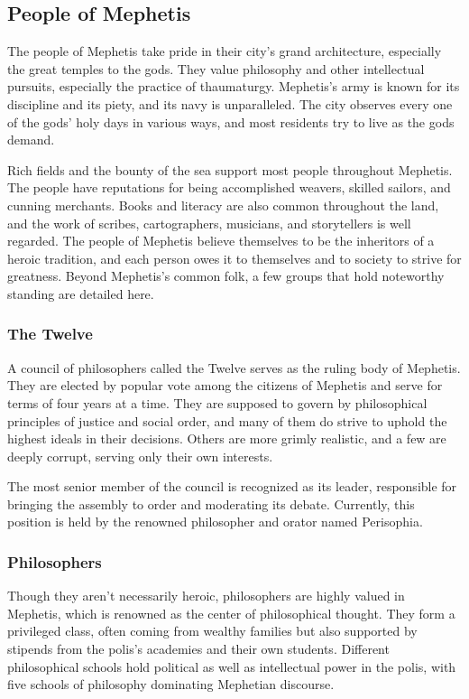 \newpage

\subsection*{People of Mephetis}
    The people of Mephetis take pride in their city's grand architecture, especially the great temples to the gods.
    They value philosophy and other intellectual pursuits, especially the practice of thaumaturgy.
    Mephetis's army is known for its discipline and its piety, and its navy is unparalleled.
    The city observes every one of the gods' holy days in various ways, and most residents try to live as the gods demand.

    Rich fields and the bounty of the sea support most people throughout Mephetis.
    The people have reputations for being accomplished weavers, skilled sailors, and cunning merchants.
    Books and literacy are also common throughout the land, and the work of scribes, cartographers, musicians, and storytellers is well regarded.
    The people of Mephetis believe themselves to be the inheritors of a heroic tradition, and each person owes it to themselves and to society to strive for greatness.
    Beyond Mephetis's common folk, a few groups that hold noteworthy standing are detailed here.

    \subsubsection{The Twelve}
        A council of philosophers called the Twelve serves as the ruling body of Mephetis.
        They are elected by popular vote among the citizens of Mephetis and serve for terms of four years at a time.
        They are supposed to govern by philosophical principles of justice and social order, and many of them do strive to uphold the highest ideals in their decisions.
        Others are more grimly realistic, and a few are deeply corrupt, serving only their own interests.

        \newpage

        The most senior member of the council is recognized as its leader, responsible for bringing the assembly to order and moderating its debate.
        Currently, this position is held by the renowned philosopher and orator named Perisophia.

    \subsubsection{Philosophers}
        Though they aren't necessarily heroic, philosophers are highly valued in Mephetis, which is renowned as the center of philosophical thought.
        They form a privileged class, often coming from wealthy families but also supported by stipends from the polis's academies and their own students.
        Different philosophical schools hold political as well as intellectual power in the polis, with five schools of philosophy dominating Mephetian discourse.

